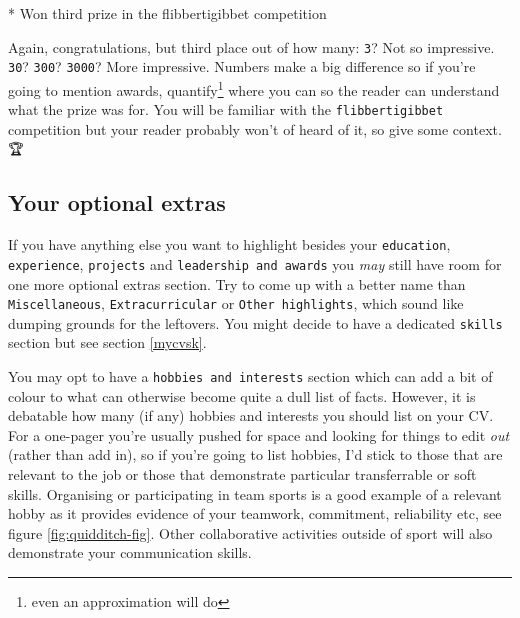 \documentclass[
]{book}
\newenvironment{Shaded}{\begin{snugshade}}{\end{snugshade}}
\newcommand{\NormalTok}[1]{#1}
\newcommand{\SpecialStringTok}[1]{\textcolor[rgb]{0.31,0.60,0.02}{#1}}
\begin{document}
\begin{Shaded}
\begin{Highlighting}[]
\SpecialStringTok{* }\NormalTok{Won third prize in the flibbertigibbet competition}
\end{Highlighting}
\end{Shaded}

Again, congratulations, but third place out of how many: \texttt{3}? Not so impressive. \texttt{30}? \texttt{300}? \texttt{3000}? More impressive. Numbers make a big difference so if you're going to mention awards, quantify\footnote{even an approximation will do} where you can so the reader can understand what the prize was for. You will be familiar with the \texttt{flibbertigibbet} competition but your reader probably won't of heard of it, so give some context. 🏆

\hypertarget{misc}{%
\subsection{Your optional extras}\label{misc}}

If you have anything else you want to highlight besides your \texttt{education}, \texttt{experience}, \texttt{projects} and \texttt{leadership\ and\ awards} you \emph{may} still have room for one more optional extras section. Try to come up with a better name than \texttt{Miscellaneous}, \texttt{Extracurricular} or \texttt{Other\ highlights}, which sound like dumping grounds for the leftovers. You might decide to have a dedicated \texttt{skills} section but see section \ref{mycvsk}.

You may opt to have a \texttt{hobbies\ and\ interests} section which can add a bit of colour to what can otherwise become quite a dull list of facts. However, it is debatable how many (if any) hobbies and interests you should list on your CV. For a one-pager you're usually pushed for space and looking for things to edit \emph{out} (rather than add in), so if you're going to list hobbies, I'd stick to those that are relevant to the job or those that demonstrate particular transferrable or soft skills. Organising or participating in team sports is a good example of a relevant hobby as it provides evidence of your teamwork, commitment, reliability etc, see figure \ref{fig:quidditch-fig}. Other collaborative activities outside of sport will also demonstrate your communication skills. \citep{hobbies}
\end{document}
